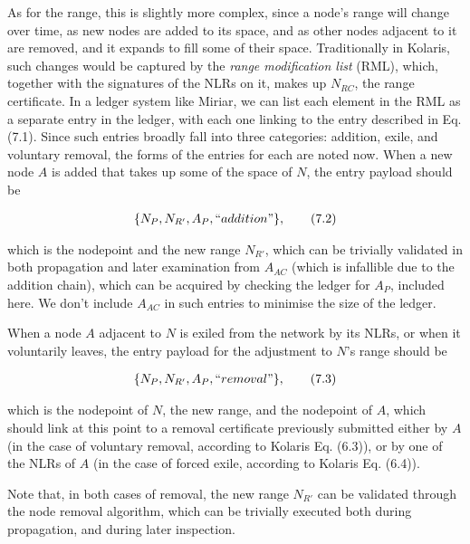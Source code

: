 \documentclass{extreport}
\begin{document}
As for the range, this is slightly more complex, since a node's range will change over time, as new nodes are added to its space, and as other nodes adjacent to it are removed, and it expands to fill some of their space. Traditionally in Kolaris, such changes would be captured by the \emph{range modification list} (RML), which, together with the signatures of the NLRs on it, makes up \(N_{RC}\), the range certificate. In a ledger system like Miriar, we can list each element in the RML as a separate entry in the ledger, with each one linking to the entry described in Eq. (7.1). Since such entries broadly fall into three categories: addition, exile, and voluntary removal, the forms of the entries for each are noted now. When a new node \(A\) is added that takes up some of the space of \(N\), the entry payload should be

\begin{align*}
\{ N_P, N_{R'}, A_P, ``addition\textrm{''} \}, \tag{7.2}
\end{align*}

which is the nodepoint and the new range \(N_{R'}\), which can be trivially validated in both propagation and later examination from \(A_{AC}\) (which is infallible due to the addition chain), which can be acquired by checking the ledger for \(A_P\), included here. We don't include \(A_{AC}\) in such entries to minimise the size of the ledger.

When a node \(A\) adjacent to \(N\) is exiled from the network by its NLRs, or when it voluntarily leaves, the entry payload for the adjustment to \(N\)'s range should be

\begin{align*}
\{ N_P, N_{R'}, A_P, ``removal\textrm{''} \}, \tag{7.3}
\end{align*}

which is the nodepoint of \(N\), the new range, and the nodepoint of \(A\), which should link at this point to a removal certificate previously submitted either by \(A\) (in the case of voluntary removal, according to Kolaris Eq. (6.3)), or by one of the NLRs of \(A\) (in the case of forced exile, according to Kolaris Eq. (6.4)).

Note that, in both cases of removal, the new range \(N_{R'}\) can be validated through the node removal algorithm, which can be trivially executed both during propagation, and during later inspection.
\end{document}
